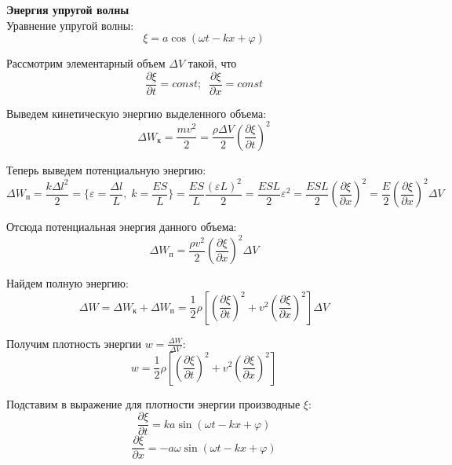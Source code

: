 \documentclass{article}
\begin{document}
	
	\textbf{Энергия упругой волны}\\

	Уравнение упругой волны:
	\begin{equation}
		\xi = a\cos(\omega t - kx + \varphi)
	\end{equation}

	Рассмотрим элементарный объем $\Delta V$ такой, что
	\begin{equation}
		\frac{\partial\xi}{\partial t} = const;\;\;\frac{\partial\xi}{\partial x} = const
	\end{equation}

	Выведем кинетическую энергию выделенного объема:
	\begin{equation}
		\Delta W_\text{к} = \frac{mv^2}{2} = \frac{\rho\Delta V}{2}(\frac{\partial\xi}{\partial t})^2
	\end{equation}

	Теперь выведем потенциальную энергию:
	\begin{equation}
		\Delta W_\text{п} = \frac{k\Delta l^2}{2} = \{\varepsilon=\frac{\Delta l}{L},\;k=\frac{ES}{L}\} = \frac{ES}{L}\frac{(\varepsilon L)^2}{2}=\frac{ESL}{2}\varepsilon^2=\frac{ESL}{2}(\frac{\partial\xi}{\partial x})^2=\frac{E}{2}(\frac{\partial\xi}{\partial x})^2\Delta V
	\end{equation}

	Отсюда потенциальная энергия данного объема:
	\begin{equation}
		\Delta W_\text{п}=\frac{\rho v^2}{2}(\frac{\partial\xi}{\partial x})^2 \Delta V
	\end{equation}

	Найдем полную энергию:
	\begin{equation}
		\Delta W = \Delta W_\text{к}+\Delta W_\text{п} = \frac{1}{2}\rho[(\frac{\partial\xi}{\partial t})^2+v^2(\frac{\partial\xi}{\partial x})^2]\Delta V
	\end{equation}

	Получим плотность энергии $w=\frac{\Delta W}{\Delta V}$:
	\begin{equation}
		w=\frac{1}{2}\rho[(\frac{\partial\xi}{\partial t})^2+v^2(\frac{\partial\xi}{\partial x})^2]
	\end{equation}

	Подставим в выражение для плотности энергии производные $\xi$:
	\begin{equation}
		\frac{\partial\xi}{\partial t} = ka\sin(\omega t - kx + \varphi)
	\end{equation}
	\begin{equation}
		\frac{\partial\xi}{\partial x} = -a\omega\sin(\omega t - kx + \varphi)
	\end{equation}
\end{document}
